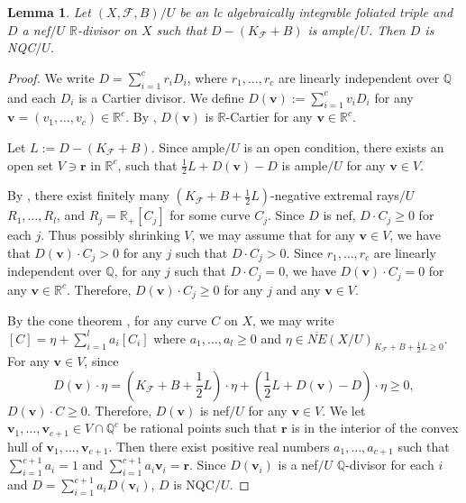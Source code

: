 \documentclass[11pt]{amsart}
\numberwithin{equation}{section}
\newcommand{\Qq}{\mathbb{Q}}
\newcommand{\Rr}{\mathbb{R}}
\newcommand{\Ff}{\mathcal{F}}
\newtheorem{lem}[thm]{Lemma}
\theoremstyle{definition}
\theoremstyle{definition}
\theoremstyle{definition}
\begin{document}
\begin{lem}\label{lem: lc+ample nef=nqc}
    Let $(X,\Ff,B)/U$ be an lc algebraically integrable foliated triple and $D$ a nef$/U$ $\Rr$-divisor on $X$ such that $D-(K_{\Ff}+B)$ is ample$/U$. Then $D$ is NQC$/U$.
\end{lem}
\begin{proof}
We write $D=\sum_{i=1}^cr_iD_i$, where $r_1,\dots,r_c$ are linearly independent over $\mathbb Q$ and each $D_i$ is a Cartier divisor. We define $D(\bm{v}):=\sum_{i=1}^cv_iD_i$ for any $\bm{v}=(v_1,\dots,v_c)\in\mathbb R^c$. By \cite[Lemma 5.3]{HLS19}, $D(\bm{v})$ is $\Rr$-Cartier for any $\bm{v}\in\mathbb R^c$. 

Let $L:=D-(K_\Ff+B)$. Since ample$/U$ is an open condition, there exists an open set $V\ni\bm{r}$ in $\mathbb R^c$, such that 
$\frac{1}{2}L+D(\bm{v})-D$ is ample$/U$ for any $\bm{v}\in V$.

By \cite[Theorem 2.3.1]{CHLX23}, there exist finitely many $\left(K_{\Ff}+B+\frac{1}{2}L\right)$-negative extremal rays$/U$ $R_1,\dots,R_l$, and $R_j=\mathbb R_+[C_j]$ for some curve $C_j$. Since $D$ is nef, $D\cdot C_j\geq 0$ for each $j$. Thus possibly shrinking $V$, we may assume that for any $\bm{v}\in V$, we have that $D(\bm{v})\cdot C_j>0$ for any $j$ such that $D\cdot C_j>0$. Since $r_1,\dots,r_c$ are linearly independent over $\mathbb Q$, for any $j$ such that $D\cdot C_j=0$, we have $D(\bm{v})\cdot C_j=0$ for any $\bm{v}\in\mathbb R^c$. Therefore,  $D(\bm{v})\cdot C_j\geq 0$ for any $j$ and any $\bm{v}\in V$.

By the cone theorem \cite[Theorem 2.3.1]{CHLX23}, for any curve $C$ on $X$, we may write
$[C]=\eta+\sum_{i=1}^l a_i[C_i]$
where $a_1,\dots,a_l\geq 0$ and $\eta\in\overline{NE}(X/U)_{K_{\Ff}+B+\frac{1}{2}L\geq 0}$. For any $\bm{v}\in V$, since
$$D(\bm{v})\cdot \eta=\left(K_\Ff+B+\frac{1}{2}L\right)\cdot \eta+\left(\frac{1}{2}L+D(\bm{v})-D\right)\cdot \eta\geq 0,$$
$D(\bm{v})\cdot C\geq 0$. Therefore, $D(\bm{v})$ is nef$/U$ for any $\bm{v}\in V$. We let $\bm{v}_1,\dots,\bm{v}_{c+1}\in V\cap\mathbb Q^c$ be rational points such that $\bm{r}$ is in the interior of the convex hull of $\bm{v}_1,\dots,\bm{v}_{c+1}$. Then there exist positive real numbers $a_1,\dots,a_{c+1}$ such that $\sum_{i=1}^{c+1}a_i=1$ and $\sum_{i=1}^{c+1}a_i\bm{v}_i=\bm{r}$. Since $D(\bm{v}_i)$ is a nef$/U$ $\Qq$-divisor for each $i$ and $D=\sum_{i=1}^{c+1}a_iD(\bm{v}_i)$, $D$ is NQC$/U$.
\end{proof}
\end{document}
